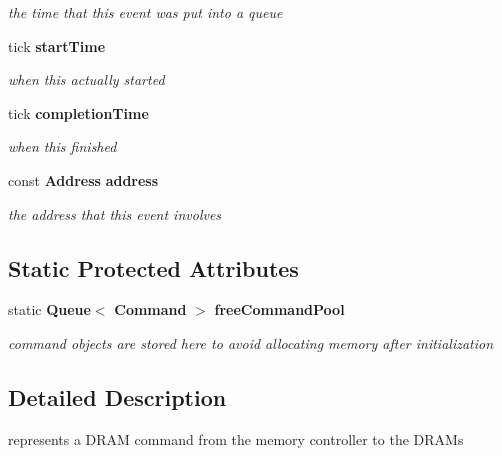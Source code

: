 \begin{DoxyCompactItemize}
\begin{DoxyCompactList}\small\item\em the time that this event was put into a queue \item\end{DoxyCompactList}\item 
tick {\bf startTime}\label{class_d_r_a_msim_i_i_1_1_event_a9f6b444813bf6568040678e0d8139d44}

\begin{DoxyCompactList}\small\item\em when this actually started \item\end{DoxyCompactList}\item 
tick {\bf completionTime}\label{class_d_r_a_msim_i_i_1_1_event_a2a6e865d555bcde6264e8726edc95b38}

\begin{DoxyCompactList}\small\item\em when this finished \item\end{DoxyCompactList}\item 
const {\bf Address} {\bf address}\label{class_d_r_a_msim_i_i_1_1_event_a6aa0830ccf3c9f103bc6dfaab1919562}

\begin{DoxyCompactList}\small\item\em the address that this event involves \item\end{DoxyCompactList}\end{DoxyCompactItemize}
\subsection*{Static Protected Attributes}
\begin{DoxyCompactItemize}
\item 
static {\bf Queue}$<$ {\bf Command} $>$ {\bf freeCommandPool}\label{class_d_r_a_msim_i_i_1_1_command_ac78f5b2f70f8ab738d7e45d7474837ff}

\begin{DoxyCompactList}\small\item\em command objects are stored here to avoid allocating memory after initialization \item\end{DoxyCompactList}\end{DoxyCompactItemize}


\subsection{Detailed Description}
represents a DRAM command from the memory controller to the DRAMs 

